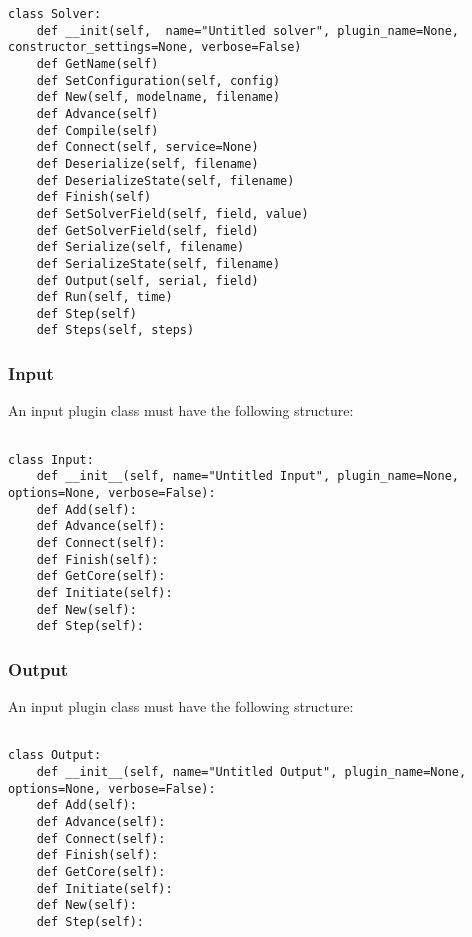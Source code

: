 \documentclass[12pt]{article}
\begin{document}
\begin{verbatim}
class Solver:
	def __init(self,  name="Untitled solver", plugin_name=None, constructor_settings=None, verbose=False)
	def GetName(self)
	def SetConfiguration(self, config)
	def New(self, modelname, filename)
	def Advance(self)
	def Compile(self)
	def Connect(self, service=None)
	def Deserialize(self, filename)
	def DeserializeState(self, filename)
	def Finish(self)
	def SetSolverField(self, field, value)
	def GetSolverField(self, field)
	def Serialize(self, filename)
	def SerializeState(self, filename)
	def Output(self, serial, field)
	def Run(self, time)
	def Step(self)
	def Steps(self, steps)
\end{verbatim}


\subsubsection*{Input}

An input plugin class must have the following structure:

\begin{verbatim}

class Input:
    def __init__(self, name="Untitled Input", plugin_name=None, options=None, verbose=False):
    def Add(self):
    def Advance(self):
    def Connect(self):
    def Finish(self):
    def GetCore(self):
    def Initiate(self):
    def New(self):
    def Step(self):
\end{verbatim}


\subsubsection*{Output}

An input plugin class must have the following structure:

\begin{verbatim}

class Output:
    def __init__(self, name="Untitled Output", plugin_name=None, options=None, verbose=False):
    def Add(self):
    def Advance(self):
    def Connect(self):
    def Finish(self):
    def GetCore(self):
    def Initiate(self):
    def New(self):
    def Step(self):
\end{verbatim}




\subsection*{}
\end{document}

